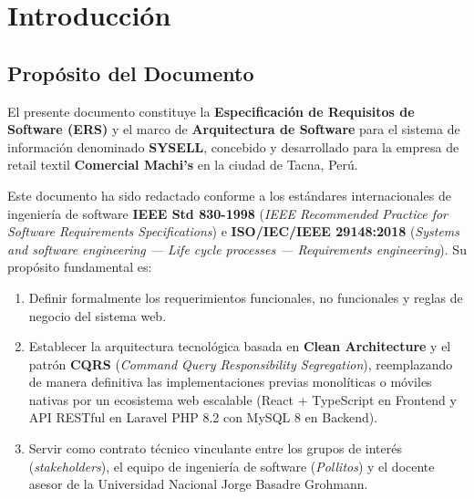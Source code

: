 
\section{Introducción}

\subsection{Propósito del Documento}
El presente documento constituye la \textbf{Especificación de Requisitos de Software (ERS)} y el marco de \textbf{Arquitectura de Software} para el sistema de información denominado \textbf{SYSELL}, concebido y desarrollado para la empresa de retail textil \textbf{Comercial Machi's} en la ciudad de Tacna, Perú.

Este documento ha sido redactado conforme a los estándares internacionales de ingeniería de software \textbf{IEEE Std 830-1998} (\textit{IEEE Recommended Practice for Software Requirements Specifications}) e \textbf{ISO/IEC/IEEE 29148:2018} (\textit{Systems and software engineering --- Life cycle processes --- Requirements engineering}). Su propósito fundamental es:
\begin{enumerate}[leftmargin=*]
    \item Definir formalmente los requerimientos funcionales, no funcionales y reglas de negocio del sistema web.
    \item Establecer la arquitectura tecnológica basada en \textbf{Clean Architecture} y el patrón \textbf{CQRS} (\textit{Command Query Responsibility Segregation}), reemplazando de manera definitiva las implementaciones previas monolíticas o móviles nativas por un ecosistema web escalable (React + TypeScript en Frontend y API RESTful en Laravel PHP 8.2 con MySQL 8 en Backend).
    \item Servir como contrato técnico vinculante entre los grupos de interés (\textit{stakeholders}), el equipo de ingeniería de software (\textit{Pollitos}) y el docente asesor de la Universidad Nacional Jorge Basadre Grohmann.
\end{enumerate}

